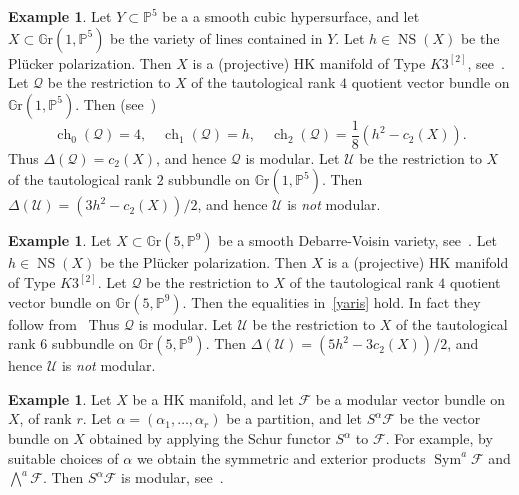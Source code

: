 \documentclass[11pt]{amsart}
\newcommand{\PP}{{\mathbb P}}
\let\mathcal\mathscr
\def\cF{\mathcal{F}}
\def\cQ{\mathcal{Q}}
\def\cU{\mathcal{U}}
\DeclareMathOperator{\ch}{ch}
\newcommand{\GR}{\mathbb{G}\mathrm{r}}
\DeclareMathOperator{\NS}{NS}
\DeclareMathOperator{\Sym}{Sym}
\theoremstyle{definition}
\newtheorem{expl}[lmm]{Example}
\theoremstyle{remark}
\begin{document}
\begin{expl}\label{expl:fvmodsubd}
%
Let $Y\subset\PP^5$ be a  a smooth cubic hypersurface, and let $X\subset\GR(1,\PP^5)$ be the variety of lines contained in $Y$.
 Let $h\in \NS(X)$ be the Pl\"ucker polarization. Then $X$ is a (projective) HK manifold of Type $K3^{[2]}$, see~\cite{beaudon}. Let $\cQ$  be  the restriction to $X$ of the tautological rank $4$  quotient vector bundle on $\GR(1,\PP^5)$. Then (see~\cite[Subsect.2.1]{og:fascimod})
%
\begin{equation}\label{yaris}
%
\ch_0(\cQ)  =  4, \quad \ch_1(\cQ)  =  h, \quad \ch_2(\cQ)  =  \frac{1}{8}\left(h^2 -c_2(X)\right).
%
\end{equation}
%
 Thus $\Delta(\cQ)=c_2(X)$, and hence $\cQ$ is modular.  
 Let $\cU$ be the restriction to $X$ of the tautological rank $2$ subbundle on $\GR(1,\PP^5)$.  Then $\Delta(\cU)=(3h^2-c_2(X))/2$, and hence $\cU$ is \emph{not} modular.
%
\end{expl}
%
%
\begin{expl}\label{expl:fvmodsudv}
%
Let $X\subset \GR(5,\PP^9)$ be a smooth Debarre-Voisin variety, see~\cite{devo}.  Let $h\in \NS(X)$ be the Pl\"ucker polarization. 
 Then $X$ is a  (projective) HK manifold of Type $K3^{[2]}$. Let 
$\cQ$ be  the restriction to $X$ of the tautological rank $4$  quotient vector bundle on $\GR(5,\PP^9)$. Then   the equalities in~\eqref{yaris} hold. 
In fact they follow from~\cite[Proof of Lemma 4.5, 2nd eqtn after (12), p.83]{devo} 
 Thus  $\cQ$ is modular. Let $\cU$ be the restriction to $X$ of the tautological rank $6$ subbundle on $\GR(5,\PP^9)$. 
 Then $\Delta(\cU)=(5h^2-3c_2(X))/2$, and hence $\cU$ is \emph{not} modular.
%
\end{expl}
%
%
\begin{expl}\label{expl:fatighenti}
%
Let $X$ be a HK manifold, and let $\cF$ be a modular vector bundle on $X$, of rank $r$. Let $\alpha=(\alpha_1,\ldots,\alpha_r)$ be a partition, and let $S^{\alpha}\cF$ be the vector bundle on $X$ obtained by applying the Schur functor $S^{\alpha}$ to $\cF$. For example, by suitable choices of $\alpha$  we obtain the symmetric and exterior products $\Sym^a\cF$ and $\bigwedge^a\cF$. Then $S^{\alpha}\cF$ is modular,
 see~\cite{fatighenti-et-alii:discreschur}.
%
\end{expl}
%
%
\end{document}

